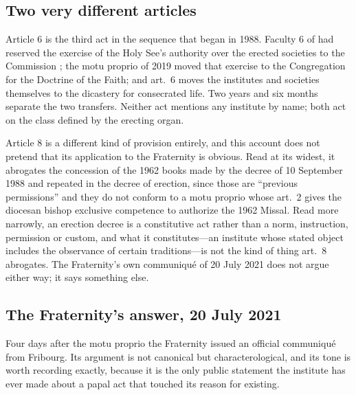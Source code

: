 \subsection{Two very different articles}

Article 6 is the third act in the sequence that began in 1988. Faculty 6
of  had reserved the exercise of the Holy
See's authority over the erected societies to the Commission
; the motu proprio of 2019 moved that
exercise to the Congregation for the Doctrine of the Faith; and
 art.~6 moves the institutes and societies
themselves to the dicastery for consecrated life. Two years and six months
separate the two transfers. Neither act mentions any institute by name;
both act on the class defined by the erecting organ.

Article 8 is a different kind of provision entirely, and this account
does not pretend that its application to the Fraternity is obvious. Read
at its widest, it abrogates the concession of the 1962 books made by the
decree of 10 September 1988 and repeated in the decree of erection, since
those are ``previous permissions'' and they do not conform to a motu
proprio whose art.~2 gives the diocesan bishop exclusive competence to
authorize the 1962 Missal. Read more narrowly, an erection decree is a
constitutive act rather than a norm, instruction, permission or custom,
and what it constitutes---an institute whose stated object includes the
observance of certain traditions---is not the kind of thing art.~8
abrogates. The Fraternity's own communiqué of 20 July 2021 does not argue
either way; it says something else.

\subsection{The Fraternity's answer, 20 July 2021}

Four days after the motu proprio the Fraternity issued an official
communiqué from Fribourg. Its argument is not canonical but
characterological, and its tone is worth recording exactly, because it is
the only public statement the institute has ever made about a papal act
that touched its reason for existing.

